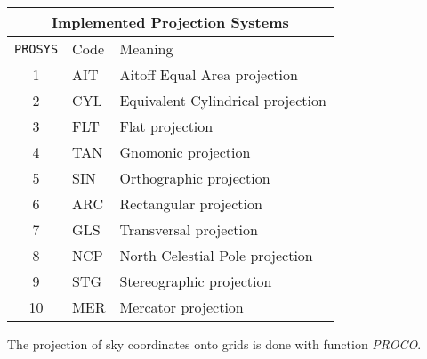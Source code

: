 \begin{center}
\begin{tabular}{|c|l|l|}
\hline
\multicolumn{3}{|c|}{Implemented Projection Systems}\\
\hline
{\tt PROSYS}&Code&Meaning\\
\hline
 1&AIT&Aitoff Equal Area projection\\
 2&CYL&Equivalent Cylindrical projection\\
 3&FLT&Flat projection\\
 4&TAN&Gnomonic projection\\
 5&SIN&Orthographic projection\\
 6&ARC&Rectangular projection\\
 7&GLS&Transversal projection\\
 8&NCP&North Celestial Pole projection\\
 9&STG&Stereographic projection\\
10&MER&Mercator projection\\
\hline
\end{tabular}
\end{center}

\noindent The projection of sky coordinates onto grids is done with function
{\sl PROCO\/}.

